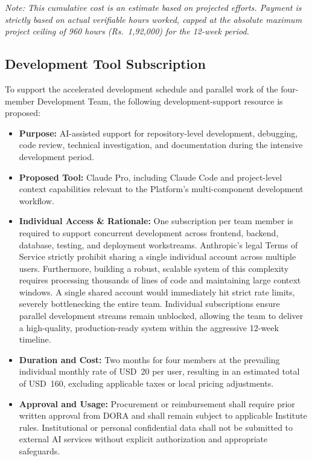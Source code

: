 \documentclass[11pt]{article}
\begin{document}
\textit{Note: This cumulative cost is an estimate based on projected efforts. Payment is strictly based on actual verifiable hours worked, capped at the absolute maximum project ceiling of 960 hours (Rs.~1,92,000) for the 12-week period.}

\subsection{Development Tool Subscription}

To support the accelerated development schedule and parallel work of the four-member Development Team, the following development-support resource is proposed:

\begin{itemize}[leftmargin=1.4em, itemsep=3pt]

\item \textbf{Purpose:} AI-assisted support for repository-level development, debugging, code review, technical investigation, and documentation during the intensive development period.

\item \textbf{Proposed Tool:} Claude Pro, including Claude Code and project-level context capabilities relevant to the Platform's multi-component development workflow.

\item \textbf{Individual Access \& Rationale:} One subscription per team member is required to support concurrent development across frontend, backend, database, testing, and deployment workstreams. Anthropic's legal Terms of Service strictly prohibit sharing a single individual account across multiple users. Furthermore, building a robust, scalable system of this complexity requires processing thousands of lines of code and maintaining large context windows. A single shared account would immediately hit strict rate limits, severely bottlenecking the entire team. Individual subscriptions ensure parallel development streams remain unblocked, allowing the team to deliver a high-quality, production-ready system within the aggressive 12-week timeline.

\item \textbf{Duration and Cost:} Two months for four members at the prevailing individual monthly rate of USD~20 per user, resulting in an estimated total of USD~160, excluding applicable taxes or local pricing adjustments.

\item \textbf{Approval and Usage:} Procurement or reimbursement shall require prior written approval from DORA and shall remain subject to applicable Institute rules. Institutional or personal confidential data shall not be submitted to external AI services without explicit authorization and appropriate safeguards.

\end{itemize}
\end{document}
